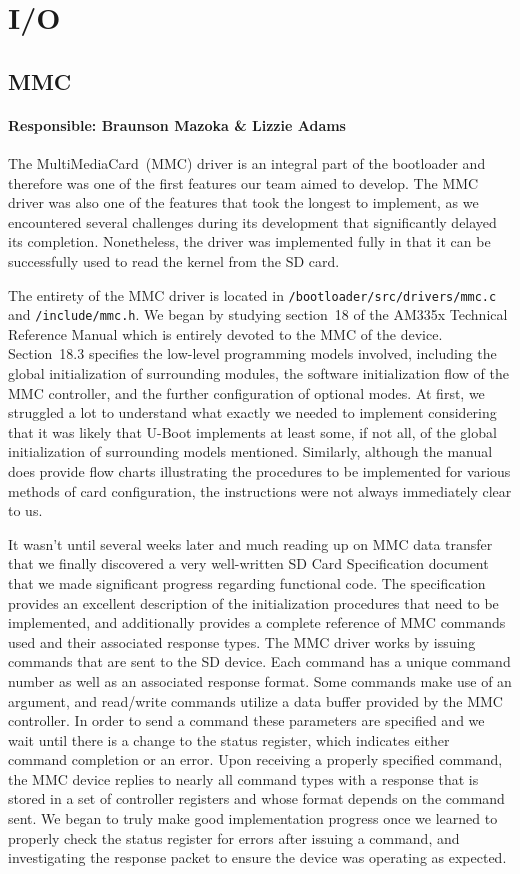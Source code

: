 \documentclass[12pt]{article}
\newcommand{\code}[1]{\colorbox{codegray}{\texttt{\footnotesize{#1}}}}
\begin{document}
\section{I/O}

\subsection{MMC}
\paragraph{Responsible: Braunson Mazoka \& Lizzie Adams} The MultiMediaCard~(MMC) driver is an integral
part of the bootloader and therefore was one of the first features our team aimed to develop. The MMC driver
was also one of the features that took the longest to implement, as we encountered several challenges during
its development that significantly delayed its completion. Nonetheless, the driver was implemented fully in
that it can be successfully used to read the kernel from the SD card.

The entirety of the MMC driver is located in \code{/bootloader/src/drivers/mmc.c} and \code{/include/mmc.h}.
We began by studying section~18 of the AM335x Technical Reference Manual which is entirely
devoted to the MMC of the device. Section~18.3 specifies the low-level programming models involved, including
the global initialization of surrounding modules, the software initialization flow of the MMC controller, and
the further configuration of optional modes. At first, we struggled a lot to understand what exactly we needed
to implement considering that it was likely that U-Boot implements at least some, if not all, of the global
initialization of surrounding models mentioned. Similarly, although the manual does provide flow charts
illustrating the procedures to be implemented for various methods of card configuration, the instructions were
not always immediately clear to us.

It wasn't until several weeks later and much reading up on MMC data transfer that we finally discovered a very
well-written SD Card Specification document that we made significant progress regarding
functional code. The specification provides an excellent description of the initialization procedures that
need to be implemented, and additionally provides a complete reference of MMC commands used and their
associated response types. The MMC driver works by issuing commands that are sent to the SD device. Each
command has a unique command number as well as an associated response format. Some commands make use of an
argument, and read/write commands utilize a data buffer provided by the MMC controller. In order to send a
command these parameters are specified and we wait until there is a change to the status register, which
indicates either command completion or an error. Upon receiving a properly specified command, the MMC device
replies to nearly all command types with a response that is stored in a set of controller registers and whose
format depends on the command sent. We began to truly make good implementation progress once we learned to
properly check the status register for errors after issuing a command, and investigating the response packet
to ensure the device was operating as expected.
\end{document}

